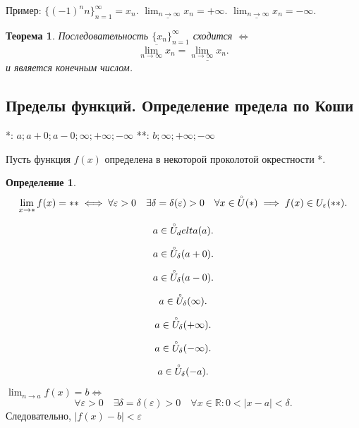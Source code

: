 \documentclass[a4paper,12pt]{article} %
\newtheorem{definition}{Определение}[subsection]
\newtheorem{theorem}{Теорема}[subsection]
\theoremstyle{remark}
\begin{document}
Пример: $\{(-1)^{n}n\}_{n=1}^{\infty} = x_n$. $\underline{\lim_{n \to \infty} x_n} = +\infty$. $\underline{\lim_{n \to \infty} x_n} = -\infty$.

\begin{theorem}
	Последовательность $\{x_n\}_{n=1}^{\infty}$ сходится $\iff$
	\[
		\overline{\lim_{n \to \infty} x_n} = \underline{\lim_{n \to \infty} x_n} 
	.\] 
	и является конечным числом.
\end{theorem}

\subsection{Пределы функций. Определение предела по Коши}
*: $a; a+0; a-0; \infty; +\infty; -\infty$
**: $b; \infty; +\infty; -\infty$

Пусть функция $f(x)$ определена в некоторой проколотой окрестности *.
\begin{definition}
	\[
	\lim_{x \to *} f(x) = ** \iff \forall \varepsilon>0 \quad \exists \delta=\delta(\varepsilon)>0 \quad \forall x\in  \accentset{\circ}{U}(*)  \implies f(x) \in  U_\varepsilon(**)
	.\] 
\end{definition}

	\[
	a \in \accentset{\circ}{U}_delta(a)
	.\] 
	\begin{center}
	\end{center}

	\[
	a \in \accentset{\circ}{U}_\delta(a+0)
	.\] 

	\[
	a \in \accentset{\circ}{U}_\delta(a-0)
	.\] 

	\[
	a \in \accentset{\circ}{U}_\delta(\infty)
	.\] 

	\[
	a \in \accentset{\circ}{U}_\delta(+\infty)
	.\] 

	\[
	a \in \accentset{\circ}{U}_\delta(-\infty)
	.\] 

	\[
	a \in \accentset{\circ}{U}_\delta(-a)
	.\] 

	$\lim_{n \to a} f(x) = b \iff$
	\[
	\forall \varepsilon>0 \quad \exists \delta=\delta(\varepsilon)>0 \quad \forall x\in \mathbb{R}: 0< |x-a| < \delta
	.\] 
	Следовательно, $|f(x)-b|<\varepsilon$ 
\end{document}
